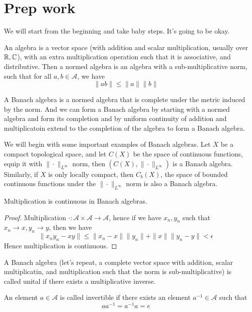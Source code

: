 \chapter{Prep work}
We will start from the beginning and take baby steps. It's going to be okay.


An algebra is a vector space (with addition and scalar multiplication, usually over $\mathbb{R}, \mathbb{C}$), with an extra multiplication operation such that it is associative, and distributive. Then a normed algebra is an algebra with a sub-multiplicative norm, such that for all $a,b\in\mathcal{A}$, we have
\begin{equation*}
    \|ab\|\leq\|a\|\|b\|
\end{equation*}
\begin{comment}
    We don't know how to multiply two vectors if we are just given a vector space. Hence giving it a norm gives us the ability to multiply. Note such multiplication is only sub-multiplicative.
\end{comment}

A Banach algebra is a normed algebra that is complete under the metric induced by the norm. And we can form a Banach algebra by starting with a normed algebra and form its completion and by uniform continuity of addition and multiplicatoin extend to the completion of the algebra to form a Banach algebra.

We will begin with some important examples of Banach algebras.
Let $X$ be a compact topological space, and let $C(X)$ be the space of continuous functions, equip it with $\|\cdot\|_{L^\infty}$ norm, then $(C(X), \|\cdot\|_{L^\infty})$ is a Banach algebra. Similarly, if $X$ is only locally compact, then $C_b(X)$, the space of bounded continuous functions under the $\|\cdot\|_{L^\infty}$ norm is also a Banach algebra.

\begin{proposition}
    Multiplication is continuous in Banach algebras.
\end{proposition}
\begin{proof}
    Multiplication $\cdot: \mathcal{A}\times\mathcal{A}\to\mathcal{A}$, hence if we have $x_n, y_n$ such that $x_n\to x, y_n\to y$, then we have
    \begin{equation*}
        \|x_ny_n-xy\|\leq\|x_n-x\|\|y_n\|+\|x\|\|y_n-y\|<\epsilon
    \end{equation*}
    Hence multiplication is continuous.
\end{proof}

\begin{definition} 
    A Banach algebra (let's repeat, a complete vector space with addition, scalar multiplicatin, and multiplication such that the norm is sub-multiplicative) is called unital if there exists a multiplicative inverse.

    An element $a\in\mathcal{A}$ is called invertible if there exists an element $a^{-1}\in\mathcal{A}$ such that
    \begin{equation*}
        aa^{-1}=a^{-1}a=e
    \end{equation*}
\end{definition}

